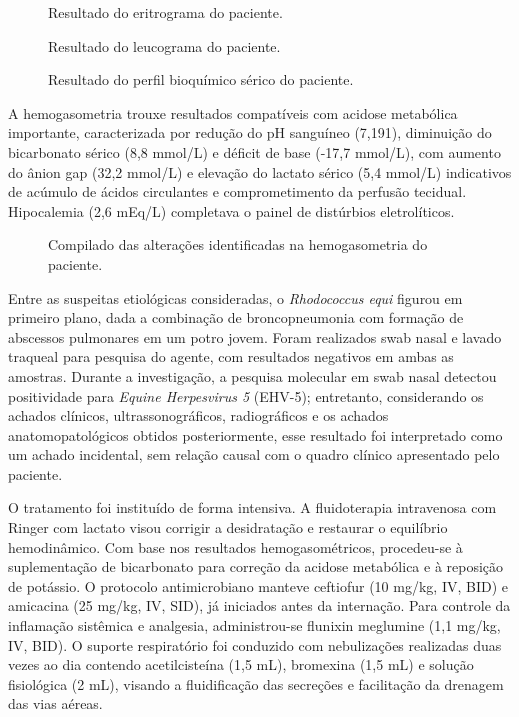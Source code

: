 \begin{figure}[htb]
  \centering
  \caption{Resultado do eritrograma do paciente.}
  \label{fig:eritrograma}
\end{figure}

\begin{figure}[htb]
  \centering
  \caption{Resultado do leucograma do paciente.}
  \label{fig:leucograma}
\end{figure}

\begin{figure}[htb]
  \centering
  \caption{Resultado do perfil bioquímico sérico do paciente.}
  \label{fig:bioquimico}
\end{figure}

A hemogasometria trouxe resultados compatíveis com acidose metabólica
importante, caracterizada por redução do pH sanguíneo (7,191),
diminuição do bicarbonato sérico (8,8 mmol/L) e déficit de base
(-17,7 mmol/L), com aumento do ânion gap (32,2 mmol/L) e elevação do
lactato sérico (5,4 mmol/L) indicativos de acúmulo de ácidos circulantes
e comprometimento da perfusão tecidual. Hipocalemia (2,6 mEq/L)
completava o painel de distúrbios eletrolíticos.

\begin{figure}[htb]
  \centering
  \caption{Compilado das alterações identificadas na hemogasometria do paciente.}
  \label{fig:hemogasometria}
\end{figure}

Entre as suspeitas etiológicas consideradas, o \textit{Rhodococcus equi}
figurou em primeiro plano, dada a combinação de broncopneumonia com
formação de abscessos pulmonares em um potro jovem. Foram realizados
swab nasal e lavado traqueal para pesquisa do agente, com resultados
negativos em ambas as amostras. Durante a investigação, a pesquisa
molecular em swab nasal detectou positividade para \textit{Equine
Herpesvirus 5} (EHV-5); entretanto, considerando os achados clínicos,
ultrassonográficos, radiográficos e os achados anatomopatológicos
obtidos posteriormente, esse resultado foi interpretado como um achado
incidental, sem relação causal com o quadro clínico apresentado pelo
paciente.

O tratamento foi instituído de forma intensiva. A fluidoterapia
intravenosa com Ringer com lactato visou corrigir a desidratação e
restaurar o equilíbrio hemodinâmico. Com base nos resultados
hemogasométricos, procedeu-se à suplementação de bicarbonato para
correção da acidose metabólica e à reposição de potássio. O protocolo
antimicrobiano manteve ceftiofur (10 mg/kg, IV, BID) e amicacina (25
mg/kg, IV, SID), já iniciados antes da internação. Para controle da
inflamação sistêmica e analgesia, administrou-se flunixin meglumine (1,1
mg/kg, IV, BID). O suporte respiratório foi conduzido com nebulizações
realizadas duas vezes ao dia contendo acetilcisteína (1,5 mL),
bromexina (1,5 mL) e solução fisiológica (2 mL), visando a fluidificação
das secreções e facilitação da drenagem das vias aéreas.

